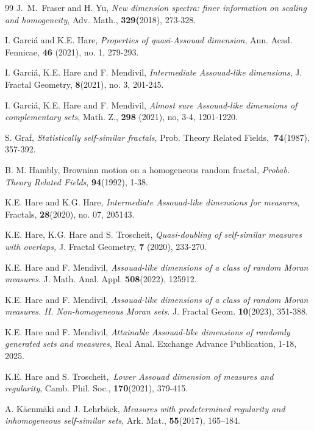 \documentclass{amsart}
\theoremstyle{plain}
\numberwithin{equation}{section}
\begin{document}
\begin{thebibliography}{99}
 J.~M.~Fraser and H. Yu, \textit{New dimension spectra: finer
information on scaling and homogeneity}, Adv. Math., \textbf{329(}2018),
273-328.

 I. Garci\'{a} and K.E. Hare, \textit{Properties of
quasi-Assouad dimension}, Ann. Acad. Fennicae, \textbf{46} (2021), no. 1,
279-293.

 I. Garci\'{a}, K.E. Hare and F. Mendivil, \textit{Intermediate
Assouad-like dimensions}, J. Fractal Geometry, \textbf{8}(2021), no. 3,
201-245.

 I. Garci\'{a}, K.E. Hare and F. Mendivil, \textit{Almost sure
Assouad-like dimensions of complementary sets}, Math. Z., \textbf{298}%
(2021), no, 3-4, 1201-1220.

 S. Graf, \textit{Statistically self-similar fractals}, Prob.
Theory Related Fields,\textbf{\ 74}(1987), 357-392.

 B. M. Hambly, Brownian motion on a homogeneous random fractal, 
\textit{Probab. Theory Related Fields}, \textbf{94}(1992), 1-38.

 K.E. Hare and K.G. Hare, \textit{Intermediate Assouad-like
dimensions for measures}, Fractals, \textbf{28}(2020), no. 07, 205143.

 K.E. Hare, K.G. Hare and S. Troscheit, \textit{Quasi-doubling
of self-similar measures with overlaps,} J. Fractal Geometry, \textbf{7}%
(2020), 233-270.

 K.E. Hare and F. Mendivil, \textit{Assouad-like dimensions of a
class of random Moran measures}. J. Math. Anal. Appl. \textbf{508}(2022),
125912.

 K.E. Hare and F. Mendivil, \textit{Assouad-like dimensions of
a class of random Moran measures. II. Non-homogeneous Moran sets}. J.
Fractal Geom. \textbf{10}(2023), 351-388.

 K.E. Hare and F. Mendivil, \textit{Attainable Assouad-like dimensions of randomly generated
sets and measures}, Real Anal. Exchange Advance Publication, 1-18, 2025.

 K.E. Hare and S. Troscheit,\textit{\ Lower Assouad dimension of
measures and regularity}, Camb. Phil. Soc., \textbf{170}(2021), 379-415.

 A. K\"{a}enm\"{a}ki and J. Lehrb\"{a}ck, \textit{Measures with
predetermined regularity and inhomogeneous self-similar sets}, Ark. Mat., 
\textbf{55}(2017), 165--184.


\end{thebibliography}
\end{document}
